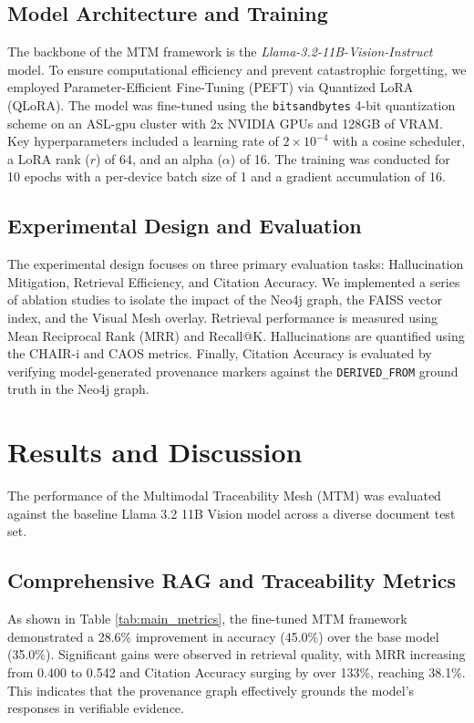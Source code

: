 \documentclass[11pt]{article}
\begin{document}
\subsection{Model Architecture and Training}
The backbone of the MTM framework is the \textit{Llama-3.2-11B-Vision-Instruct} model. To ensure computational efficiency and prevent catastrophic forgetting, we employed Parameter-Efficient Fine-Tuning (PEFT) via Quantized LoRA (QLoRA). The model was fine-tuned using the \texttt{bitsandbytes} 4-bit quantization scheme on an ASL-gpu cluster with 2x NVIDIA GPUs and 128GB of VRAM. Key hyperparameters included a learning rate of $2\times 10^{-4}$ with a cosine scheduler, a LoRA rank ($r$) of 64, and an alpha ($\alpha$) of 16. The training was conducted for 10 epochs with a per-device batch size of 1 and a gradient accumulation of 16.

\subsection{Experimental Design and Evaluation}
The experimental design focuses on three primary evaluation tasks: Hallucination Mitigation, Retrieval Efficiency, and Citation Accuracy. We implemented a series of ablation studies to isolate the impact of the Neo4j graph, the FAISS vector index, and the Visual Mesh overlay. Retrieval performance is measured using Mean Reciprocal Rank (MRR) and Recall@K. Hallucinations are quantified using the CHAIR-i and CAOS metrics. Finally, Citation Accuracy is evaluated by verifying model-generated provenance markers against the \texttt{DERIVED\_FROM} ground truth in the Neo4j graph.

\section{Results and Discussion}
The performance of the Multimodal Traceability Mesh (MTM) was evaluated against the baseline Llama 3.2 11B Vision model across a diverse document test set.

\subsection{Comprehensive RAG and Traceability Metrics}
As shown in Table \ref{tab:main_metrics}, the fine-tuned MTM framework demonstrated a 28.6\% improvement in accuracy (45.0\%) over the base model (35.0\%). Significant gains were observed in retrieval quality, with MRR increasing from 0.400 to 0.542 and Citation Accuracy surging by over 133\%, reaching 38.1\%. This indicates that the provenance graph effectively grounds the model's responses in verifiable evidence.
\end{document}

